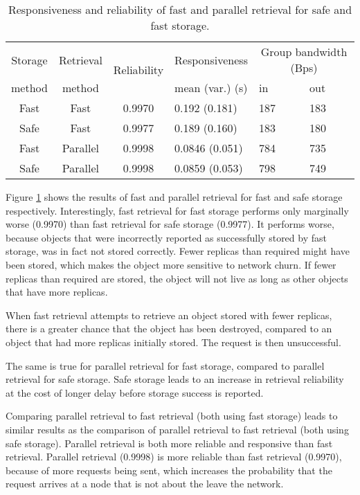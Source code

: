 \begin{table}[htbp]
\centering
\begin{tabular}{|c|c|c|l|l|l|}
\hline
Storage & Retrieval & \multirow{2}{*}{Reliability} & Responsiveness & \multicolumn{2}{c|}{Group bandwidth (Bps)} \\
\cline{5-6}
   method      &     method       &             &mean (var.) (s)& in&out\\
\hline
Fast           &   Fast           &   0.9970    &  0.192 (0.181) & 187&183\\
Safe           &   Fast           &   0.9977    &  0.189 (0.160) & 183&180\\
Fast           &   Parallel       &   0.9998    &  0.0846 (0.051)& 784&735\\
Safe           &   Parallel       &   0.9998    &  0.0859 (0.053)& 798&749\\
\hline
\end{tabular}
\caption{Responsiveness and reliability of fast and parallel retrieval for safe and fast storage.}
\label{tab_pithos_results}
\end{table}
%
Figure \ref{tab_pithos_results} shows the results of fast and parallel retrieval for fast and safe storage respectively. Interestingly, fast retrieval for fast storage performs only marginally worse (0.9970) than fast retrieval for safe storage (0.9977). It performs worse, because objects that were incorrectly reported as successfully stored by fast storage, was in fact not stored correctly. Fewer replicas than required might have been stored, which makes the object more sensitive to network churn. If fewer replicas than required are stored, the object will not live as long as other objects that have more replicas.

When fast retrieval attempts to retrieve an object stored with fewer replicas, there is a greater chance that the object has been destroyed, compared to an object that had more replicas initially stored. The request is then unsuccessful.

The same is true for parallel retrieval for fast storage, compared to parallel retrieval for safe storage. Safe storage leads to an increase in retrieval reliability at the cost of longer delay before storage success is reported.

Comparing parallel retrieval to fast retrieval (both using fast storage) leads to similar results as the comparison of parallel retrieval to fast retrieval (both using safe storage). Parallel retrieval is both more reliable and responsive than fast retrieval. Parallel retrieval (0.9998) is more reliable than fast retrieval (0.9970), because of more requests being sent, which increases the probability that the request arrives at a node that is not about the leave the network.

